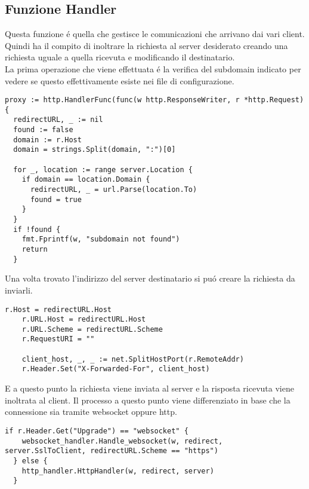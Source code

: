 \subsection{Funzione Handler}
Questa funzione é quella che gestisce le comunicazioni che arrivano dai vari client. Quindi ha il compito di inoltrare la richiesta al server desiderato creando una richiesta uguale a quella ricevuta e modificando il destinatario.\\La prima operazione che viene effettuata é la verifica del subdomain indicato per vedere se questo effettivamente esiste nei file di configurazione.
\begin{lstlisting}[language=Golang]
proxy := http.HandlerFunc(func(w http.ResponseWriter, r *http.Request) {
  redirectURL, _ := nil
  found := false
  domain := r.Host
  domain = strings.Split(domain, ":")[0]

  for _, location := range server.Location {
    if domain == location.Domain {
      redirectURL, _ = url.Parse(location.To)
      found = true
    }
  }
  if !found {
    fmt.Fprintf(w, "subdomain not found")
    return
  }
\end{lstlisting}

Una volta trovato l'indirizzo del server destinatario si puó creare la richiesta da inviarli.
\begin{lstlisting}[language=Golang]
	r.Host = redirectURL.Host
	r.URL.Host = redirectURL.Host
	r.URL.Scheme = redirectURL.Scheme
	r.RequestURI = ""

	client_host, _, _ := net.SplitHostPort(r.RemoteAddr)
	r.Header.Set("X-Forwarded-For", client_host)
\end{lstlisting}
E a questo punto la richiesta viene inviata al server e la risposta ricevuta viene inoltrata al client. Il processo a questo punto viene differenziato in base che la connessione sia tramite websocket oppure http.
\begin{lstlisting}[language=Golang]
  if r.Header.Get("Upgrade") == "websocket" {
    websocket_handler.Handle_websocket(w, redirect, server.SslToClient, redirectURL.Scheme == "https")
  } else {
    http_handler.HttpHandler(w, redirect, server)
  }
\end{lstlisting}

